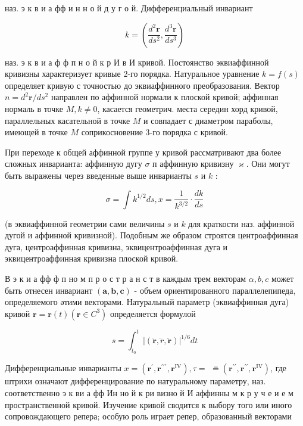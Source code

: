 \documentclass[10pt]{article}
\begin{document}
наз. э к в и а фф и н н о й д у г о й. Дифференциальный инвариант



\[

k=\left(\frac{d^{2} \boldsymbol{r}}{d s^{2}}, \frac{d^{3} \boldsymbol{r}}{d s^{3}}\right)

\]



наз. э к в и а ф ф п н о й к р И в И кривой. Постоянство эквиаффинной кривизны характеризует кривые 2-го порядка. Натуральное уравнение $k=f(s)$ определяет кривую с точностью до эквиаффинного преобразования. Вектор $n=d^{2} \boldsymbol{r} / d s^{2}$ направлен по аффинной нормали к плоской кривой; аффинная нормаль в точке $M, k \neq 0$, касается геометрич. места середин хорд кривой, параллельных касательной в точке $M$ и совпадает с диаметром параболы, имеющей в точке $M$ соприкосновение 3-го порядка с кривой.



При переходе к общей аффинной группе у кривой рассматривают два более сложных инварианта: аффинную дугу $\sigma$ п аффинную кривизну $\varkappa$. Они могут быть выражены через введенные выше инварианты $s$ и $k$ :



\[

\sigma=\int k^{1 / 2} d s, x=\frac{1}{k^{3 / 2}} \cdot \frac{d k}{d s}

\]



(в эквиаффинной геометрии сами величины $s$ и $k$ для краткости наз. аффинной дугой и аффинной кривизной). Подобным же образом строятся центроаффинная дуга, центроаффинная кривизна, эквицентроаффинная дуга и эквицентроаффинная кривизна плоской кривой.



В э к и а фф ф п но м п р о с т р а н с т в каждым трем векторам $\alpha, b, c$ может быть отнесен инвариант $(\boldsymbol{a}, \boldsymbol{b}, \boldsymbol{c})$ - объем ориентированного параллелепипеда, определяемого әтими векторами. Натуральный параметр (эквиаффинная дуга) кривой $\boldsymbol{r}=\boldsymbol{r}(t)\left(\boldsymbol{r} \in C^{3}\right)$ определяется формулой



\[

s=\int_{t_{0}}^{t}|(\dot{\boldsymbol{r}}, \ddot{r}, \ddot{\boldsymbol{r}})|^{1 / 6} d t

\]



Дифференциальные инварианты $x=\left(\boldsymbol{r}^{\prime}, \boldsymbol{r}^{\prime \prime \prime}, \boldsymbol{r}^{\mathrm{IV}}\right), \tau=$ $\stackrel{=}{=}\left(\boldsymbol{r}^{\prime \prime}, \boldsymbol{r}^{\prime \prime}, \boldsymbol{r}^{\mathrm{IV}}\right)$, где штрихи означают дифференцирование по натуральному параметру, наз. соответственно э к ви а фф Ин но й к ри визно й И аффинны м к р у ч е и е м пространственной кривой. Изучение кривой сводится к выбору того или иного сопровождающего репера; особую роль играет репер, образованный векторами
\end{document}
